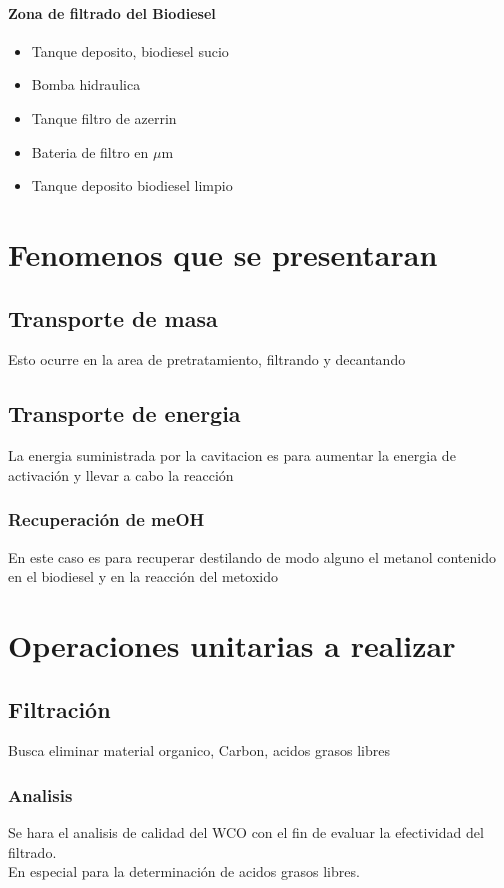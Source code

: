\documentclass[a4paper,10pt]{article}
\begin{document}
\paragraph{Zona de filtrado del Biodiesel}
\begin{itemize}
 \item Tanque deposito, biodiesel sucio
 \item Bomba hidraulica
 \item Tanque filtro de azerrin
 \item Bateria de filtro en $\mu$m
 \item Tanque deposito biodiesel limpio
\end{itemize}

\section{Fenomenos que se presentaran}
  \subsection{Transporte de masa}
    Esto ocurre en la area de pretratamiento, filtrando y decantando
  \subsection{Transporte de energia}
    La energia suministrada por la cavitacion es para aumentar la energia de activación y llevar a cabo la reacción
    \subsubsection{Recuperación de meOH}
      En este caso es para recuperar destilando de modo alguno el metanol contenido en el biodiesel y en la reacción del metoxido
\section{Operaciones unitarias a realizar}
  \subsection{Filtración}
  Busca eliminar material organico, Carbon, acidos grasos libres
  \subsubsection{Analisis}
    Se hara el analisis de calidad del WCO con el fin de evaluar la efectividad del filtrado.\\
    En especial para la determinación de acidos grasos libres.
\end{document}
